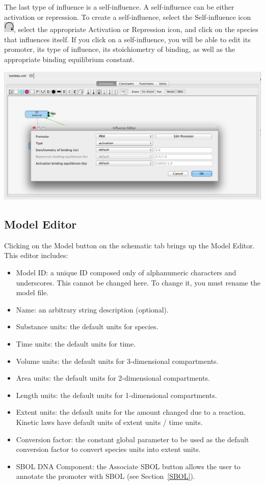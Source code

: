 \documentclass[titlepage,11pt]{article}
\begin{document}
The last type of influence is a self-influence.  A self-influence can be either activation or repression.  To create a self-influence, select the Self-influence icon \includegraphics{../gui/icons/modelview/self_influence_selected}, select the appropriate Activation or Repression icon, and click on the species that influences itself.  If you click on a self-influence, you will be able to edit its promoter, its type of influence, its stoichiometry of binding, as well as the appropriate binding equilibrium constant. 

\begin{center}
\includegraphics[width=160mm]{screenshots/selfInfluence}
\end{center}

\subsection{\label{ModelEditor}Model Editor}

\noindent
Clicking on the Model button on the schematic tab brings up the Model Editor.  This editor includes:
\begin{itemize}
\item Model ID: a unique ID composed only of alphanumeric characters and underscores.  This cannot be changed here.  To change it, you must rename the model file.
\item Name: an arbitrary string description (optional).
\item Substance units: the default units for species.
\item Time units: the default units for time.
\item Volume units: the default units for 3-dimensional compartments.
\item Area units: the default units for 2-dimensional compartments.
\item Length units: the default units for 1-dimensional compartments.
\item Extent units: the default units for the amount changed due to a reaction.  Kinetic laws have default units of extent units / time units.  
\item Conversion factor: the constant global parameter to be used as the default conversion factor to convert species units into extent units.
\item SBOL DNA Component: the Associate SBOL button allows the user to annotate the promoter with SBOL (see Section~\ref{SBOL}).
\end{itemize}
\end{document}
